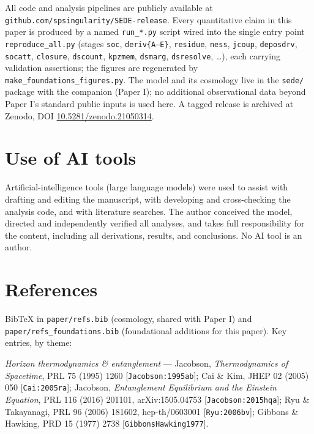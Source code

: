 \documentclass[
  10pt,
]{article}
\begin{document}
All code and analysis pipelines are publicly available at
\texttt{github.com/spsingularity/SEDE-release}. Every quantitative claim
in this paper is produced by a named \texttt{run\_*.py} script wired
into the single entry point \texttt{reproduce\_all.py} (stages
\texttt{soc}, \texttt{deriv\{A–E\}}, \texttt{residue}, \texttt{ness},
\texttt{jcoup}, \texttt{deposdrv}, \texttt{socatt}, \texttt{closure},
\texttt{dscount}, \texttt{kpzmem}, \texttt{dsmarg}, \texttt{dsresolve},
\ldots), each carrying validation assertions; the figures are
regenerated by \texttt{make\_foundations\_figures.py}. The model and its
cosmology live in the \texttt{sede/} package with the companion (Paper
I); no additional observational data beyond Paper I's standard public
inputs is used here. A tagged release is archived at Zenodo, DOI
\href{https://doi.org/10.5281/zenodo.21050314}{10.5281/zenodo.21050314}.

\section{Use of AI tools}\label{use-of-ai-tools}

Artificial-intelligence tools (large language models) were used to
assist with drafting and editing the manuscript, with developing and
cross-checking the analysis code, and with literature searches. The
author conceived the model, directed and independently verified all
analyses, and takes full responsibility for the content, including all
derivations, results, and conclusions. No AI tool is an author.

\section{References}\label{references}

BibTeX in \texttt{paper/refs.bib} (cosmology, shared with Paper I) and
\texttt{paper/refs\_foundations.bib} (foundational additions for this
paper). Key entries, by theme:

\emph{Horizon thermodynamics \& entanglement} --- Jacobson,
\emph{Thermodynamics of Spacetime}, PRL 75 (1995) 1260
{[}\texttt{Jacobson:1995ab}{]}; Cai \& Kim, JHEP 02 (2005) 050
{[}\texttt{Cai:2005ra}{]}; Jacobson, \emph{Entanglement Equilibrium and
the Einstein Equation}, PRL 116 (2016) 201101, arXiv:1505.04753
{[}\texttt{Jacobson:2015hqa}{]}; Ryu \& Takayanagi, PRL 96 (2006)
181602, hep-th/0603001 {[}\texttt{Ryu:2006bv}{]}; Gibbons \& Hawking,
PRD 15 (1977) 2738 {[}\texttt{GibbonsHawking1977}{]}.
\end{document}

